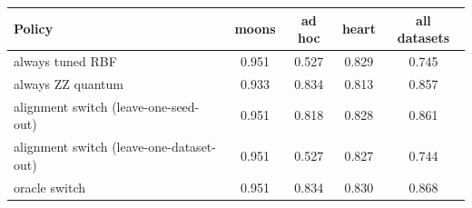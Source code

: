 \begin{tabular}{lcccc}
\toprule
Policy & moons & ad hoc & heart & all datasets \\
\midrule
always tuned RBF & 0.951 & 0.527 & 0.829 & 0.745 \\
always ZZ quantum & 0.933 & 0.834 & 0.813 & 0.857 \\
alignment switch (leave-one-seed-out) & 0.951 & 0.818 & 0.828 & 0.861 \\
alignment switch (leave-one-dataset-out) & 0.951 & 0.527 & 0.827 & 0.744 \\
oracle switch & 0.951 & 0.834 & 0.830 & 0.868 \\
\bottomrule
\end{tabular}
